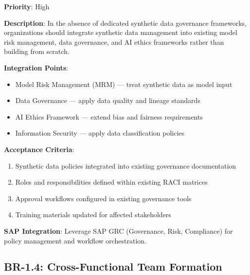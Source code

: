 \documentclass[12pt,a4paper,twoside]{report}
\begin{document}
\begin{tcolorbox}[colback=blue!5,colframe=blue!70,title=BR-1.3: Existing Governance Framework Integration]
\textbf{Priority}: High

\textbf{Description}: In the absence of dedicated synthetic data governance
frameworks, organizations should integrate synthetic data management into existing
model risk management, data governance, and AI ethics frameworks rather than
building from scratch.

\textbf{Integration Points}:
\begin{itemize}
\item Model Risk Management (MRM) --- treat synthetic data as model input
\item Data Governance --- apply data quality and lineage standards
\item AI Ethics Framework --- extend bias and fairness requirements
\item Information Security --- apply data classification policies
\end{itemize}

\textbf{Acceptance Criteria}:
\begin{enumerate}
\item Synthetic data policies integrated into existing governance documentation
\item Roles and responsibilities defined within existing RACI matrices
\item Approval workflows configured in existing governance tools
\item Training materials updated for affected stakeholders
\end{enumerate}

\textbf{SAP Integration}: Leverage SAP GRC (Governance, Risk, Compliance) for
policy management and workflow orchestration.
\end{tcolorbox}

\subsection{BR-1.4: Cross-Functional Team Formation}
\end{document}
